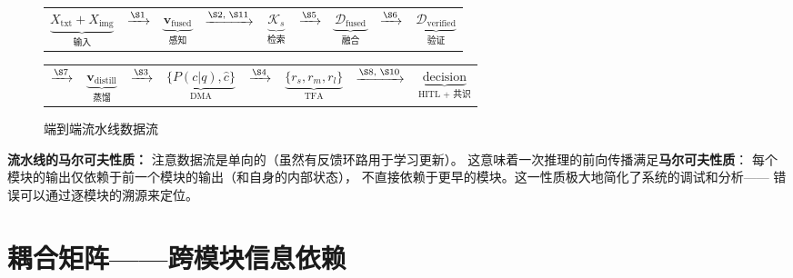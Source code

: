 \documentclass[11pt,a4paper]{ctexart}
\theoremstyle{remark}
\begin{document}
\begin{figure}[H]
\centering
\small
\begin{tabular}{c@{\,}c@{\,}c@{\,}c@{\,}c@{\,}c@{\,}c@{\,}c@{\,}c}
$\underbrace{X_{\text{txt}} + X_{\text{img}}}_{\text{输入}}$ &
$\xrightarrow{\text{\S1}}$ &
$\underbrace{\mathbf{v}_{\text{fused}}}_{\text{感知}}$ &
$\xrightarrow{\text{\S2, \S11}}$ &
$\underbrace{\mathcal{K}_s}_{\text{检索}}$ &
$\xrightarrow{\text{\S5}}$ &
$\underbrace{\mathcal{D}_{\text{fused}}}_{\text{融合}}$ &
$\xrightarrow{\text{\S6}}$ &
$\underbrace{\mathcal{D}_{\text{verified}}}_{\text{验证}}$ \\[6pt]
\end{tabular}

\vspace{6pt}
\begin{tabular}{c@{\,}c@{\,}c@{\,}c@{\,}c@{\,}c@{\,}c}
$\xrightarrow{\text{\S7}}$ &
$\underbrace{\mathbf{v}_{\text{distill}}}_{\text{蒸馏}}$ &
$\xrightarrow{\text{\S3}}$ &
$\underbrace{\{P(c|q), \hat{c}\}}_{\text{DMA}}$ &
$\xrightarrow{\text{\S4}}$ &
$\underbrace{\{r_s, r_m, r_l\}}_{\text{TFA}}$ &
$\xrightarrow{\text{\S8, \S10}}$ &
$\underbrace{\text{decision}}_{\text{HITL + 共识}}$
\end{tabular}
\caption{端到端流水线数据流}
\end{figure}

\textbf{流水线的马尔可夫性质：} 注意数据流是单向的（虽然有反馈环路用于学习更新）。
这意味着一次推理的前向传播满足\textbf{马尔可夫性质}：
每个模块的输出仅依赖于前一个模块的输出（和自身的内部状态），
不直接依赖于更早的模块。这一性质极大地简化了系统的调试和分析——
错误可以通过逐模块的溯源来定位。

\section{耦合矩阵——跨模块信息依赖}
\end{document}
